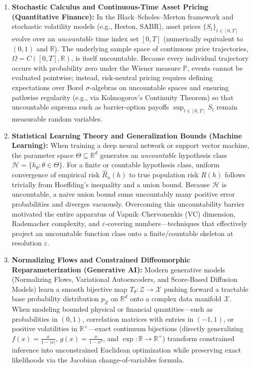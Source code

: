 \documentclass[11pt, letterpaper]{article}
\theoremstyle{definition}
\theoremstyle{remark}
\begin{document}
\begin{enumerate}
    \item \textbf{Stochastic Calculus and Continuous-Time Asset Pricing (Quantitative Finance):}
    In the Black–Scholes–Merton framework and stochastic volatility models (e.g., Heston, SABR), asset prices $\{S_t\}_{t \in [0, T]}$ evolve over an \emph{uncountable} time index set $[0, T]$ (numerically equivalent to $(0, 1)$ and $\mathbb{R}$). The underlying sample space of continuous price trajectories, $\Omega = C([0, T], \mathbb{R})$, is itself uncountable. Because every individual trajectory occurs with probability zero under the Wiener measure $\mathbb{P}$, events cannot be evaluated pointwise; instead, risk-neutral pricing requires defining expectations over Borel $\sigma$-algebras on uncountable spaces and ensuring pathwise regularity (e.g., via Kolmogorov's Continuity Theorem) so that uncountable suprema such as barrier-option payoffs $\sup_{t \in [0, T]} S_t$ remain measurable random variables.

    \item \textbf{Statistical Learning Theory and Generalization Bounds (Machine Learning):}
    When training a deep neural network or support vector machine, the parameter space $\Theta \subseteq \mathbb{R}^d$ generates an \emph{uncountable} hypothesis class $\mathcal{H} = \{h_\theta : \theta \in \Theta\}$. For a finite or countable hypothesis class, uniform convergence of empirical risk $\hat{R}_n(h)$ to true population risk $R(h)$ follows trivially from Hoeffding's inequality and a union bound. Because $\mathcal{H}$ is uncountable, a naive union bound sums uncountably many positive error probabilities and diverges vacuously. Overcoming this uncountability barrier motivated the entire apparatus of Vapnik–Chervonenkis (VC) dimension, Rademacher complexity, and $\varepsilon$-covering numbers—techniques that effectively project an uncountable function class onto a finite/countable skeleton at resolution $\varepsilon$.

    \item \textbf{Normalizing Flows and Constrained Diffeomorphic Reparameterization (Generative AI):}
    Modern generative models (Normalizing Flows, Variational Autoencoders, and Score-Based Diffusion Models) learn a smooth bijective map $T_\theta : \mathcal{Z} \to \mathcal{X}$ pushing forward a tractable base probability distribution $p_Z$ on $\mathbb{R}^d$ onto a complex data manifold $\mathcal{X}$. When modeling bounded physical or financial quantities—such as probabilities in $(0, 1)$, correlation matrices with entries in $(-1, 1)$, or positive volatilities in $\mathbb{R}^+$—exact continuum bijections (directly generalizing $f(x) = \frac{x}{1-|x|}$, $g(x) = \frac{x}{1-x^2}$, and $\exp : \mathbb{R} \to \mathbb{R}^+$) transform constrained inference into unconstrained Euclidean optimization while preserving exact likelihoods via the Jacobian change-of-variables formula.
\end{enumerate}
\end{document}
